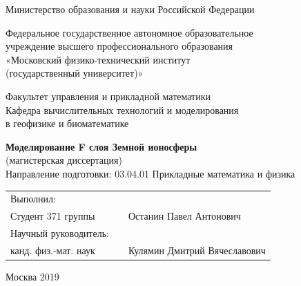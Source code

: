 \documentclass[14pt, a4paper]{extarticle}
\begin{document}
\begin{titlepage}

\begin{center}
	Министерство образования и науки Российской Федерации
	
	Федеральное государственное автономное образовательное\\[-6pt]
	учреждение высшего профессионального образования\\[-6pt]
	«Московский физико-технический институт\\[-6pt]
	(государственный университет)»
	
	Факультет управления и прикладной математики\\[-6pt]
	Кафедра вычислительных технологий и моделирования\\[-6pt]
в геофизике и биоматематике\\
\end{center}

\vspace{20mm}

\begin{center}
	{\Large {\bf Моделирование F слоя Земной ионосферы\\[8mm] }} 
	(магистерская диссертация)\\
	Направление подготовки: 03.04.01 Прикладные математика и физика
\end{center}

\vspace{20mm}

\begin{flushleft}
	\begin{tabularx}{\textwidth}{lcl}
		Выполнил: \\
		Студент 371 группы  & \raisebox{-3pt}{\rule{3cm}{0.5pt}} & Останин Павел Антонович \\[5mm]
		
		Научный руководитель:\\
		канд. физ.-мат. наук & \raisebox{-3pt}{\rule{3cm}{0.5pt}} & Кулямин Дмитрий Вячеславович \\[5mm]
	\end{tabularx}
\end{flushleft}

\vfill

\begin{center}
	Москва 2019
\end{center}

\end{titlepage}


\tableofcontents
\clearpage
\end{document}
